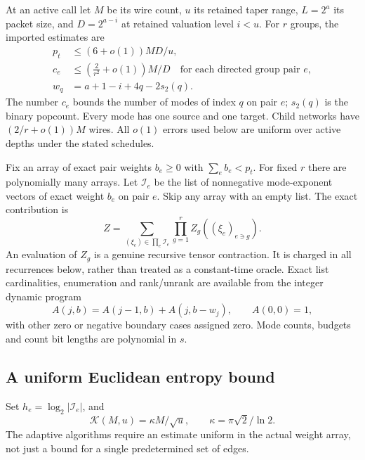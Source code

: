 \documentclass[11pt,letterpaper]{article}
\theoremstyle{remark}\newtheorem{remark}[theorem]{Remark}
\newcommand{\pc}{s_2}
\newcommand{\kap}{\kappa}
\newcommand{\K}{\mathcal K}
\begin{document}
At an active call let $M$ be its wire count, $u$ its retained taper range,
$L=2^a$ its packet size, and $D=2^{a-i}$ at retained valuation level
$i<u$. For $r$ groups, the imported estimates are
\begin{align}
 p_t&\le(6+o(1))MD/u,\label{eq:import-p}\\
 c_e&\le\left(\frac2{r^2}+o(1)\right)M/D
 \quad\text{for each directed group pair }e,\label{eq:import-c}\\
 w_q&=a+1-i+4q-2\pc(q).\label{eq:import-w}
\end{align}
The number $c_e$ bounds the number of modes of index $q$ on pair $e$;
$\pc(q)$ is the binary popcount. Every mode has one source and one target.
Child networks have $(2/r+o(1))M$ wires. All $o(1)$ errors used below are
uniform over active depths under the stated schedules.

Fix an array of exact pair weights $b_e\ge0$ with $\sum_e b_e<p_t$.
For fixed $r$ there are polynomially many arrays. Let $\mathcal I_e$ be
the list of nonnegative mode-exponent vectors of exact weight $b_e$ on
pair $e$. Skip any array with an empty list. The exact contribution is
\begin{equation}\label{eq:mode-graph}
 Z=\sum_{(\xi_e)\in\prod_e\mathcal I_e}
       \prod_{g=1}^r Z_g((\xi_e)_{e\ni g}).
\end{equation}
An evaluation of $Z_g$ is a genuine recursive tensor contraction. It is
charged in all recurrences below, rather than treated as a constant-time
oracle. Exact list cardinalities, enumeration and rank/unrank are
available from the integer dynamic program
\[
 A(j,b)=A(j-1,b)+A(j,b-w_j),\qquad A(0,0)=1,
\]
with other zero or negative boundary cases assigned zero. Mode counts,
budgets and count bit lengths are polynomial in $s$.

\subsection{A uniform Euclidean entropy bound}
Set $h_e=\log_2|\mathcal I_e|$, and
\[
 \K(M,u)=\kap M/\sqrt u,\qquad \kap=\pi\sqrt2/\ln2.
\]
The adaptive algorithms require an estimate uniform in the actual weight
array, not just a bound for a single predetermined set of edges.
\end{document}
